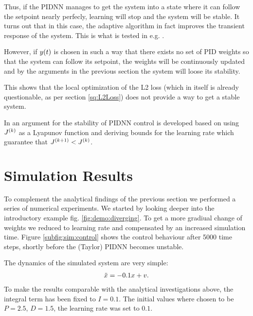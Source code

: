 \documentclass{article}
\begin{document}
    Thus, if the PIDNN manages to get the system into a state where it can follow the setpoint nearly perfecly, 
    learning will stop and the system will be stable. 
    It turns out that in this case, the adaptive algorithm in fact improves the transient response of the system. This
    is what is tested in e.g. \cite{yu_applying_2006}.

    However, if $y(t)$ is chosen in such a way that there exists no set of PID weights so that the system can 
    follow its setpoint, the weights will be continuously updated and by the arguments in the previous section the 
    system will loose its stability.

    This shows that the local optimization of the L2 loss (which in itself is already questionable, as per 
    section \ref{sq:L2Loss}) does not provide a way to get a stable system.

    In \cite{cong_novel_2005} an argument for the stability of PIDNN control is
    developed based on using ${J}^{(k)}$ as a Lyapunov function and deriving 
    bounds for the learning rate which guarantee that 
    ${J}^{(k+1)} < {J}^{(k)}$.












  \section{Simulation Results}
    To complement the analytical findings of the previous section we performed a series of numerical experiments. 
    We started by looking deeper into the introductory example fig. \ref{fig:demo:diverging}. To get a more gradiual 
    change of weights we reduced to learning rate and compensated by an increased simulation time. Figure 
    \ref{subfig:sim:control} shows the control behaviour after 5000 time steps, shortly before the (Taylor) PIDNN becomes
    unstable. 

    The dynamics of the simulated system are very simple: 
    \begin{align}
        \ddot{x} = -0.1 x + v. \label{eq:demo_system}
    \end{align}
    To make the results comparable with the analytical investigations above, the integral term has been fixed to $I=0.1$.
    The initial values where chosen to be $P=2.5$, $D=1.5$, the learning rate was set to $0.1$.
\end{document}
